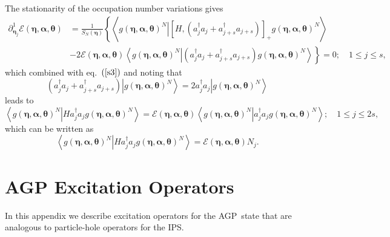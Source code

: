 \documentclass[aps,preprint]{revtex4}%
\begin{document}
The stationarity of the occupation number variations gives
\begin{align}
\partial_{\bm{\eta}_{j}}^{1}\mathcal{E}\left(
\bm{\eta},\bm{\alpha},\bm{\theta}\right)   &  =\frac{1}{S_{N}\left(
\bm{\eta}\right)  }\left\{  \left\langle \left.  g\left(
\bm{\eta },\bm{\alpha},\bm{\theta}\right)  ^{N}\right\vert \left[  H,\left(
a_{j}^{\dagger}a_{j}+a_{j+s}^{\dagger}a_{j+s}\right)  \right]  _{+}g\left(
\bm{\eta},\bm{\alpha},\bm{\theta}\right)  ^{N}\right\rangle \right.
\nonumber\\
&  -\left.  2\mathcal{E}\left(  \bm{\eta},\bm{\alpha},\bm{\theta }\right)
\left\langle \left.  g\left(  \bm{\eta},\bm{\alpha },\bm{\theta}\right)
^{N}\right\vert \left(  a_{j}^{\dagger}a_{j}+a_{j+s}^{\dagger}a_{j+s}\right)
g\left(  \bm{\eta},\bm{\alpha },\bm{\theta}\right)  ^{N}\right\rangle
\right\}  =0;\quad1\leq j\leq s,
\end{align}
which combined with eq.\ $\left(  \ref{s3}\right)  $ and noting that
\begin{equation}
\left(  a_{j}^{\dagger}a_{j}+a_{j+s}^{\dagger}a_{j+s}\right)  \left\vert
g\left(  \bm{\eta},\bm{\alpha},\bm{\theta}\right)  ^{N}\right\rangle
=2a_{j}^{\dagger}a_{j}\left\vert g\left(
\bm{\eta },\bm{\alpha},\bm{\theta}\right)  ^{N}\right\rangle
\end{equation}
leads to
\begin{equation}
\left\langle \left.  g\left(  \bm{\eta},\bm{\alpha},\bm{\theta }\right)
^{N}\right\vert Ha_{j}^{\dagger}a_{j}g\left(
\bm{\eta },\bm{\alpha},\bm{\theta}\right)  ^{N}\right\rangle =\mathcal{E}%
\left(  \bm{\eta},\bm{\alpha},\bm{\theta}\right)  \left\langle \left.
g\left(  \bm{\eta},\bm{\alpha},\bm{\theta}\right)  ^{N}\right\vert
a_{j}^{\dagger}a_{j}g\left(  \bm{\eta},\bm{\alpha },\bm{\theta}\right)
^{N}\right\rangle ;\quad1\leq j\leq2s,
\end{equation}
which can be written as
\begin{equation}
\left\langle \left.  g\left(  \bm{\eta},\bm{\alpha},\bm{\theta }\right)
^{N}\right\vert Ha_{j}^{\dagger}a_{j}g\left(
\bm{\eta },\bm{\alpha},\bm{\theta}\right)  ^{N}\right\rangle =\mathcal{E}%
\left(  \bm{\eta},\bm{\alpha},\bm{\theta}\right)  N_{j}.
\end{equation}


\section{AGP Excitation Operators\label{q_op}}

In this appendix we describe excitation operators for the AGP\ state that are
analogous to particle-hole operators for the IPS.
\end{document}
